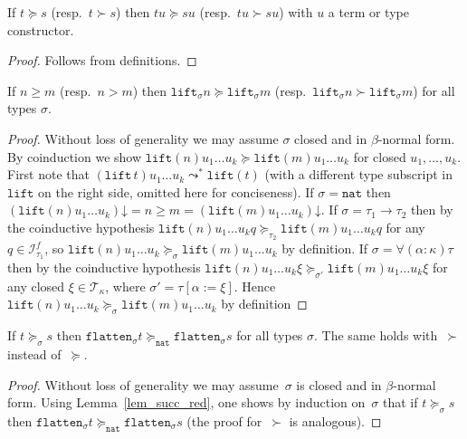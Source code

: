\documentclass[a4paper,UKenglish,cleveref,autoref,numberwithinsect]{lipics-v2019}
\theoremstyle{definition}
\newcommand{\Iterms}{\mathcal{I}}
\newcommand{\arrtype}{\rightarrow}
\newcommand{\subst}[2]{#1:=#2}
\newcommand{\nat}{\mathtt{nat}}
\newcommand{\flatten}{\mathtt{flatten}}
\newcommand{\lift}{\mathtt{lift}}
\newcommand{\Tc}{\mathcal{T}}
\newcommand{\da}{\mathord{\downarrow}}
\begin{document}
\begin{lemma}\label{lem_app_succ}
  If $t \succeq s$ (resp.~$t \succ s$) then $t u \succeq s u$
  (resp.~$t u \succ s u$) with $u$ a term or type constructor.
\end{lemma}

\begin{proof}
  Follows from definitions.
\end{proof}

\begin{lemma}\label{lem:liftgreater}
  If $n \geq m$ (resp.~$n > m$) then $\lift_\sigma n \succeq
  \lift_\sigma m$ (resp.~$\lift_\sigma n \succ \lift_\sigma m$) for
  all types $\sigma$.
\end{lemma}

\begin{proof}
  Without loss of generality we may assume $\sigma$ closed and in
  $\beta$-normal form. By coinduction we show $\lift(n) u_1 \ldots u_k
  \succeq \lift(m) u_1 \ldots u_k$ for closed $u_1,\ldots,u_k$. First
  note that $(\lift\,t) u_1 \ldots u_k \leadsto^* \lift(t)$ (with a
  different type subscript in~$\lift$ on the right side, omitted here
  for conciseness). If $\sigma = \nat$ then $(\lift(n) u_1 \ldots
  u_k)\da = n \ge m = (\lift(m) u_1 \ldots u_k)\da$. If $\sigma =
  \tau_1\arrtype\tau_2$ then by the coinductive hypothesis $\lift(n)
  u_1 \ldots u_k q \succeq_{\tau_2} \lift(m) u_1 \ldots u_k q$ for any
  $q \in \Iterms^f_{\tau_1}$, so $\lift(n) u_1 \ldots u_k
  \succeq_{\sigma} \lift(m) u_1 \ldots u_k$ by definition. If $\sigma
  = \forall(\alpha:\kappa)\tau$ then by the coinductive hypothesis
  $\lift(n) u_1 \ldots u_k \xi \succeq_{\sigma'} \lift(m) u_1 \ldots
  u_k \xi$ for any closed $\xi \in \Tc_\kappa$, where $\sigma' =
  \tau[\subst{\alpha}{\xi}]$. Hence $\lift(n) u_1 \ldots u_k
  \succeq_{\sigma} \lift(m) u_1 \ldots u_k$ by definition
\end{proof}

\begin{lemma}\label{lem_flatten_succ}
  If $t \succeq_\sigma s$ then $\flatten_\sigma t \succeq_\nat
  \flatten_\sigma s$ for all types $\sigma$. The same holds
  with~$\succ$ instead of~$\succeq$.
\end{lemma}

\begin{proof}
  Without loss of generality we may assume~$\sigma$ is closed and in
  $\beta$-normal form. Using Lemma~\ref{lem_succ_red}, one shows by
  induction on~$\sigma$ that if $t \succeq_\sigma s$ then
  $\flatten_\sigma t \succeq_\nat \flatten_\sigma s$ (the proof
  for~$\succ$ is analogous).
\end{proof}
\end{document}
